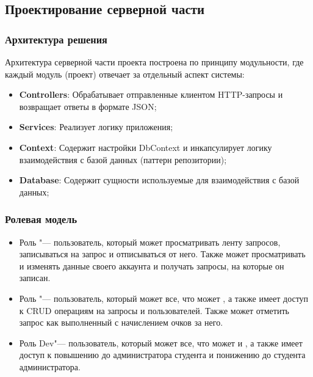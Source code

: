 \subsection{Проектирование серверной части}

\subsubsection{Архитектура решения}

Архитектура серверной части проекта построена по принципу модульности, где каждый модуль (проект) отвечает за отдельный аспект системы:

\begin{itemize}
	\item{\textbf{Controllers}: Обрабатывает отправленные клиентом HTTP-запросы и возвращает ответы в формате JSON;}
	\item{\textbf{Services}: Реализует логику приложения;}
	\item{\textbf{Context}: Содержит настройки DbContext и инкапсулирует логику взаимодействия с базой данных (паттерн репозитории);}	
	\item{\textbf{Database}: Содержит сущности используемые для взаимодействия с базой данных;}
\end{itemize}

\subsubsection{Ролевая модель}
 
\begin{itemize}
	\item{Роль \guillemetright "--- пользователь, который может просматривать ленту запросов, записываться на запрос и отписываться от него. Также может просматривать и изменять данные своего аккаунта и получать запросы, на которые он записан.}
	\item{Роль \guillemetright "--- пользователь, который может все, что может \guillemetright, а также имеет доступ к CRUD операциям на запросы и пользователей. Также может отметить запрос как выполненный с начислением очков за него.}
	\item{Роль \guillemetleft Dev\guillemetright"--- пользователь, который может все, что может \guillemetright и \guillemetright , а также имеет доступ к повышению до администратора студента и понижению до студента администратора.}
\end{itemize}

